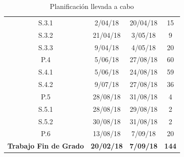 \begin{table}[H]
\begin{tabular}{cccc}
\rowcolor[HTML]{FFFC9E} 
{\color[HTML]{333333} S.3.1}                                    & {\color[HTML]{333333} 2/04/18}           & {\color[HTML]{333333} 20/04/18}         & {\color[HTML]{333333} 15}               \\
\rowcolor[HTML]{FFFC9E} 
{\color[HTML]{333333} S.3.2}                                    & {\color[HTML]{333333} 21/04/18}          & {\color[HTML]{333333} 3/05/18}          & {\color[HTML]{333333} 9}                \\
\rowcolor[HTML]{FFFC9E} 
{\color[HTML]{333333} S.3.3}                                    & {\color[HTML]{333333} 9/04/18}           & {\color[HTML]{333333} 4/05/18}          & {\color[HTML]{333333} 20}               \\
\rowcolor[HTML]{67FD9A} 
P.4                                                             & 5/06/18                                  & 27/08/18                                & 60                                      \\
\rowcolor[HTML]{9AFF99} 
S.4.1                                                           & 5/06/18                                  & 24/08/18                                & 59                                      \\
\rowcolor[HTML]{9AFF99} 
S.4.2                                                           & 9/07/18                                  & 27/08/18                                & 36                                      \\
\rowcolor[HTML]{38FFF8} 
P.5                                                             & 28/08/18                                 & 31/08/18                                & 4                                       \\
\rowcolor[HTML]{96FFFB} 
S.5.1                                                           & 28/08/18                                 & 29/08/18                                & 2                                       \\
\rowcolor[HTML]{96FFFB} 
S.5.2                                                           & 30/08/18                                 & 31/08/18                                & 2                                       \\
\rowcolor[HTML]{96FFFB} 
P.6                                                             & 13/08/18                                 & 7/09/18                                 & 20                                      \\
\rowcolor[HTML]{000000} 
{\color[HTML]{FFFFFF} \textbf{Trabajo Fin de Grado}}            & {\color[HTML]{FFFFFF} \textbf{20/02/18}} & {\color[HTML]{FFFFFF} \textbf{7/09/18}} & {\color[HTML]{FFFFFF} \textbf{144}}    
\end{tabular}
\caption{Planificación llevada a cabo}
\label{tab:plan2}
\end{table}

